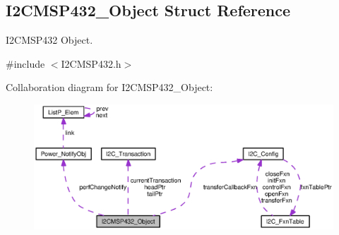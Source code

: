\subsection{I2\+C\+M\+S\+P432\+\_\+\+Object Struct Reference}
\label{struct_i2_c_m_s_p432___object}


I2\+C\+M\+S\+P432 Object.  




{\ttfamily \#include $<$I2\+C\+M\+S\+P432.\+h$>$}



Collaboration diagram for I2\+C\+M\+S\+P432\+\_\+\+Object\+:
\nopagebreak
\begin{figure}[H]
\begin{center}
\leavevmode
\includegraphics[width=350pt]{struct_i2_c_m_s_p432___object__coll__graph}
\end{center}
\end{figure}
